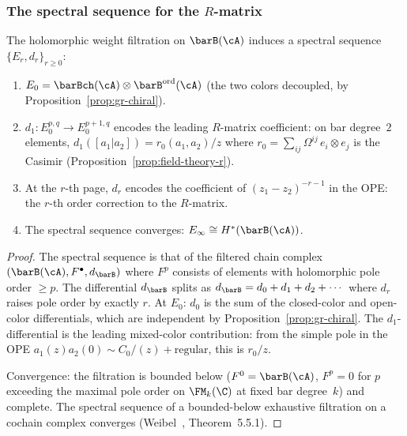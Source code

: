 \subsubsection*{The spectral sequence for the $R$-matrix}

\begin{proposition}
The holomorphic weight filtration on $\barB(\cA)$
induces a spectral sequence $\{E_r, d_r\}_{r \ge 0}$:
\begin{enumerate}[label=\textup{(\roman*)}]
\item $E_0 = \barBch(\cA) \otimes \barB^{\mathrm{ord}}(\cA)$
 (the two colors decoupled, by
 Proposition~\ref{prop:gr-chiral}).
\item $d_1 \colon E_0^{p,q} \to E_0^{p+1,q}$ encodes the
 leading $R$-matrix coefficient: on bar degree~$2$ elements,
 $d_1([a_1 | a_2]) = r_0(a_1, a_2)/z$ where
 $r_0 = \sum_{ij} \Omega^{ij}\, e_i \otimes e_j$ is the
 Casimir (Proposition~\ref{prop:field-theory-r}).
\item At the $r$-th page, $d_r$ encodes the coefficient of
 $(z_1-z_2)^{-r-1}$ in the OPE: the $r$-th order correction
 to the $R$-matrix.
\item The spectral sequence converges:
 $E_\infty \cong H^\ast(\barB(\cA))$.
\end{enumerate}
\end{proposition}

\begin{proof}
The spectral sequence is that of the filtered chain complex
$(\barB(\cA), F^\bullet, d_{\barB})$ where
$F^p$ consists of elements with holomorphic pole order $\ge p$.
The differential $d_{\barB}$ splits as
$d_{\barB} = d_0 + d_1 + d_2 + \cdots$ where $d_r$ raises
pole order by exactly $r$. At $E_0$: $d_0$ is the sum of the
closed-color and open-color differentials, which are
independent by Proposition~\ref{prop:gr-chiral}. The
$d_1$-differential is the leading mixed-color contribution:
from the simple pole in the OPE $a_1(z) a_2(0) \sim
C_0/(z) + \mathrm{regular}$, this is $r_0/z$.

Convergence: the filtration is bounded below ($F^0 =
\barB(\cA)$, $F^p = 0$ for $p$ exceeding the
maximal pole order on $\FM_k(\C)$ at fixed bar degree~$k$)
and complete. The spectral sequence of a bounded-below
exhaustive filtration on a cochain complex converges
(Weibel~\cite{Wei94}, Theorem~5.5.1).
\end{proof}

